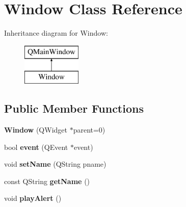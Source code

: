 \hypertarget{class_window}{}\section{Window Class Reference}
\label{class_window}
Inheritance diagram for Window\+:\begin{figure}[H]
\begin{center}
\leavevmode
\includegraphics[height=2.000000cm]{class_window}
\end{center}
\end{figure}
\subsection*{Public Member Functions}
\begin{DoxyCompactItemize}
\item 
\hypertarget{class_window_ab27fe44e0834066236f79f244b02f67e}{}{\bfseries Window} (Q\+Widget $\ast$parent=0)\label{class_window_ab27fe44e0834066236f79f244b02f67e}

\item 
\hypertarget{class_window_a0af393c895469fe202200eefb7e43e5e}{}bool {\bfseries event} (Q\+Event $\ast$event)\label{class_window_a0af393c895469fe202200eefb7e43e5e}

\item 
\hypertarget{class_window_a881940d1cff5b0ed7af7c601443e25d0}{}void {\bfseries set\+Name} (Q\+String pname)\label{class_window_a881940d1cff5b0ed7af7c601443e25d0}

\item 
\hypertarget{class_window_aa6c44398bab8bc643a1fe1472fe223e5}{}const Q\+String {\bfseries get\+Name} ()\label{class_window_aa6c44398bab8bc643a1fe1472fe223e5}

\item 
\hypertarget{class_window_a9a63b5db3c68174e5cb50a4254f4dfe6}{}void {\bfseries play\+Alert} ()\label{class_window_a9a63b5db3c68174e5cb50a4254f4dfe6}

\end{DoxyCompactItemize}
